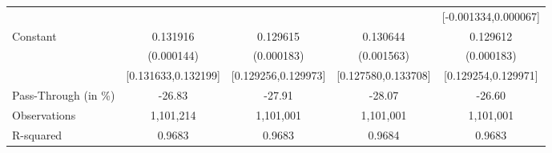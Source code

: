 {\begin{tabular}{l*{4}{c}}
                    &                     &                     &                     &[-0.001334,0.000067]         \\
Constant            &    0.131916\sym{***}&    0.129615\sym{***}&    0.130644\sym{***}&    0.129612\sym{***}\\
                    &  (0.000144)         &  (0.000183)         &  (0.001563)         &  (0.000183)         \\
                    &[0.131633,0.132199]         &[0.129256,0.129973]         &[0.127580,0.133708]         &[0.129254,0.129971]         \\
\midrule
Pass-Through (in \%)&      -26.83         &      -27.91         &      -28.07         &      -26.60         \\
Observations        &   1,101,214         &   1,101,001         &   1,101,001         &   1,101,001         \\
R-squared           &      0.9683         &      0.9683         &      0.9684         &      0.9683         \\
\bottomrule
\end{tabular}
}
